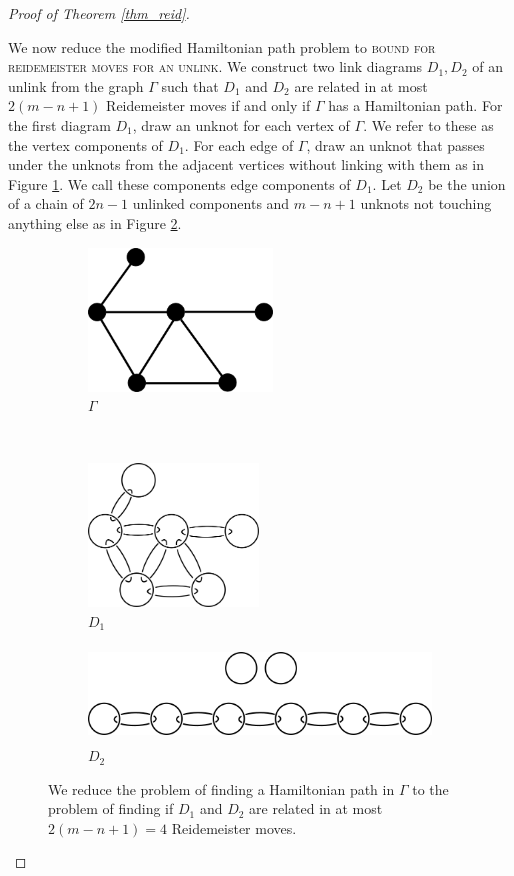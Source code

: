 \documentclass[12pt]{amsart}
\theoremstyle{definition}
\theoremstyle{remark}
\begin{document}
\begin{proof}[Proof of Theorem \ref{thm_reid}]
\begin{figure}[ht]
\end{figure}

We now reduce the modified Hamiltonian path problem to \textsc{bound for reidemeister moves for an unlink}.
We construct two link diagrams $D_1, D_2$ of an unlink from the graph $\Gamma$ such that $D_1$ and $D_2$ are related in at most $2(m-n+1)$ Reidemeister moves if and only if $\Gamma$ has a Hamiltonian path.
For the first diagram $D_1$, draw an unknot for each vertex of $\Gamma$.
We refer to these as the vertex components of $D_1$.
For each edge of $\Gamma$, draw an unknot that passes under the unknots from the adjacent vertices without linking with them as in Figure \ref{fig_reidboundb}.
We call these components edge components of $D_1$.
Let $D_2$ be the union of a chain of $2n-1$ unlinked components and $m-n+1$ unknots not touching anything else as in Figure \ref{fig_reidboundc}.

\begin{figure}[ht]
\centering
    \begin{subfigure}[b]{0.4\textwidth}
        \centering
        \includegraphics[height=1.5in]{reidbound_graph.png}
        \caption{$\Gamma$}
    \end{subfigure}%
    ~
    \begin{subfigure}[b]{0.4\textwidth}
        \centering
        \includegraphics[height=1.5in]{reidbound_link1.png}
        \caption{$D_1$}
        \label{fig_reidboundb}
    \end{subfigure}


        \begin{subfigure}[b]{0.8\textwidth}
        \centering
        \includegraphics[height=1in]{reidbound_link2.png}
        \caption{$D_2$}
        \label{fig_reidboundc}
    \end{subfigure}
\caption{We reduce the problem of finding a Hamiltonian path in $\Gamma$ to the problem of finding if $D_1$ and $D_2$ are related in at most $2(m-n+1)=4$ Reidemeister moves.}
\label{fig_reidbound}
\end{figure}


\end{proof}
\end{document}
